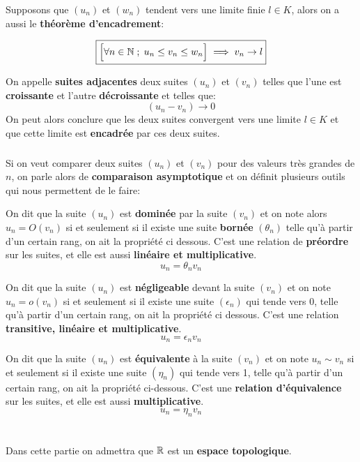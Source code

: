 Supposons que \((u_n)\) et \((w_n)\) tendent vers une limite finie \(l \in K\), alors on a aussi le \textbf{théorème d'encadrement}:

\[
    \boxed{
            \Bigr[\forall n \in \mathbb{N} \; ; \; u_n \leq v_n \leq w_n \Bigr] \implies v_n \rightarrow l
    }
\]

On appelle \textbf{suites adjacentes} deux suites \((u_n)\) et \((v_n)\) telles que l'une est \textbf{croissante} et l'autre \textbf{décroissante} et telles que:
\[
    (u_n - v_n) \rightarrow 0
\]
On peut alors conclure que les deux suites convergent vers une limite \(l \in K\) et que cette limite est \textbf{encadrée} par ces deux suites.

\subsection*{}
Si on veut comparer deux suites \((u_n)\) et \((v_n)\) pour des valeurs très grandes de \(n\), on parle alors de \textbf{comparaison asymptotique} et on définit plusieurs outils qui nous permettent de le faire:\<

On dit que la suite \((u_n)\) est \textbf{dominée} par la suite \((v_n)\) et on note alors \(u_n = O(v_n)\) si et seulement si il existe une suite \textbf{bornée} \((\theta_n)\) telle qu'à partir d'un certain rang, on ait la propriété ci dessous.\+
C'est une relation de \textbf{préordre} sur les suites, et elle est aussi \textbf{linéaire et multiplicative}.
\[
    u_n = \theta_n v_n
\]


On dit que la suite \((u_n)\) est \textbf{négligeable} devant la suite \((v_n)\) et on note \(u_n = o(v_n)\) si et seulement si il existe une suite \((\epsilon_n)\) qui tende vers 0, telle qu'à partir d'un certain rang, on ait la propriété ci dessous.\+
C'est une relation \textbf{transitive, linéaire et multiplicative}.
\[
    u_n = \epsilon_n v_n
\]

On dit que la suite \((u_n)\) est \textbf{équivalente} à la suite \((v_n)\) et on note \(u_n \sim v_n\) si et seulement si il existe une suite \((\eta_n)\) qui tende vers 1, telle qu'à partir d'un certain rang, on ait la propriété ci-dessous.\+ 
C'est une \textbf{relation d'équivalence} sur les suites, et elle est aussi \textbf{multiplicative}. 
\[
    u_n = \eta_n v_n
\]

\chapter*{}
Dans cette partie on admettra que \(\mathbb{R}\) est un \textbf{espace topologique}.

